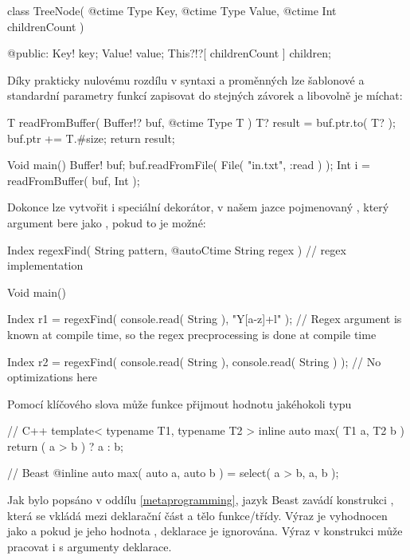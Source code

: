 \begin{code}
class TreeNode( @ctime Type Key, @ctime Type Value, @ctime Int childrenCount ) {
	
@public:
	Key! key;
	Value! value;
	This?!?[ childrenCount ] children;
	
}
\end{code}

Díky prakticky nulovému rozdílu v syntaxi \ctime a \nonctime proměnných lze šablonové a standardní parametry funkcí zapisovat do stejných závorek a libovolně je míchat:

\begin{code}
T readFromBuffer( Buffer!? buf, @ctime Type T ) {
	T? result = buf.ptr.to( T? );
	buf.ptr += T.#size;
	return result;
}

Void main() {
	Buffer! buf;
	buf.readFromFile( File( "in.txt", :read ) ); 
	Int i = readFromBuffer( buf, Int );
}
\end{code}

Dokonce lze vytvořit i speciální dekorátor, v našem jazce pojmenovaný , který argument bere jako \ctime, pokud to je možné:

\begin{code}
Index regexFind( String pattern, @autoCtime String regex ) {
	// regex implementation
}

Void main() {
	Index r1 = regexFind( console.read( String ), "Y[a-z]+l" ); // Regex argument is known at compile time, so the regex precprocessing is done at compile time
	
	Index r2 = regexFind( console.read( String ), console.read( String ) ); // No optimizations here
}
\end{code}

Pomocí klíčového slova  může funkce přijmout hodnotu jakéhokoli typu

\begin{cppcode}
// C++
template< typename T1, typename T2 >
inline auto max( T1 a, T2 b ) {
	return ( a  > b ) ? a : b;
}
\end{cppcode}

\begin{code}
// Beast
@inline auto max( auto a, auto b ) = select( a > b, a, b );
\end{code}

Jak bylo popsáno v oddílu \ref{metaprogramming}, jazyk Beast zavádí konstrukci , která se vkládá mezi deklarační část a tělo funkce/třídy. Výraz  je vyhodnocen jako  a pokud je jeho hodnota , deklarace je ignorována. Výraz v konstrukci může pracovat i s \ctime argumenty deklarace.

